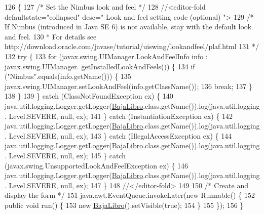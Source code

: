 \begin{DoxyCode}
126                                            \{
127         \textcolor{comment}{/* Set the Nimbus look and feel */}
128         \textcolor{comment}{//<editor-fold defaultstate="collapsed" desc=" Look and feel setting code (optional) ">}
129         \textcolor{comment}{/* If Nimbus (introduced in Java SE 6) is not available, stay with the default look and feel.}
130 \textcolor{comment}{         * For details see http://download.oracle.com/javase/tutorial/uiswing/lookandfeel/plaf.html }
131 \textcolor{comment}{         */}
132         \textcolor{keywordflow}{try} \{
133             \textcolor{keywordflow}{for} (javax.swing.UIManager.LookAndFeelInfo info : javax.swing.UIManager.
      getInstalledLookAndFeels()) \{
134                 \textcolor{keywordflow}{if} (\textcolor{stringliteral}{"Nimbus"}.equals(info.getName())) \{
135                     javax.swing.UIManager.setLookAndFeel(info.getClassName());
136                     \textcolor{keywordflow}{break};
137                 \}
138             \}
139         \} \textcolor{keywordflow}{catch} (ClassNotFoundException ex) \{
140             java.util.logging.Logger.getLogger(\mbox{\hyperlink{class_interfaz_package_1_1_baja_libro_a2675599a2976eb47169b0b174c7ee93a}{BajaLibro}}.class.getName()).log(java.util.logging.
      Level.SEVERE, null, ex);
141         \} \textcolor{keywordflow}{catch} (InstantiationException ex) \{
142             java.util.logging.Logger.getLogger(\mbox{\hyperlink{class_interfaz_package_1_1_baja_libro_a2675599a2976eb47169b0b174c7ee93a}{BajaLibro}}.class.getName()).log(java.util.logging.
      Level.SEVERE, null, ex);
143         \} \textcolor{keywordflow}{catch} (IllegalAccessException ex) \{
144             java.util.logging.Logger.getLogger(\mbox{\hyperlink{class_interfaz_package_1_1_baja_libro_a2675599a2976eb47169b0b174c7ee93a}{BajaLibro}}.class.getName()).log(java.util.logging.
      Level.SEVERE, null, ex);
145         \} \textcolor{keywordflow}{catch} (javax.swing.UnsupportedLookAndFeelException ex) \{
146             java.util.logging.Logger.getLogger(\mbox{\hyperlink{class_interfaz_package_1_1_baja_libro_a2675599a2976eb47169b0b174c7ee93a}{BajaLibro}}.class.getName()).log(java.util.logging.
      Level.SEVERE, null, ex);
147         \}
148         \textcolor{comment}{//</editor-fold>}
149 
150         \textcolor{comment}{/* Create and display the form */}
151         java.awt.EventQueue.invokeLater(\textcolor{keyword}{new} Runnable() \{
152             \textcolor{keyword}{public} \textcolor{keywordtype}{void} run() \{
153                 \textcolor{keyword}{new} \mbox{\hyperlink{class_interfaz_package_1_1_baja_libro_a2675599a2976eb47169b0b174c7ee93a}{BajaLibro}}().setVisible(\textcolor{keyword}{true});
154             \}
155         \});
156     \}
\end{DoxyCode}


